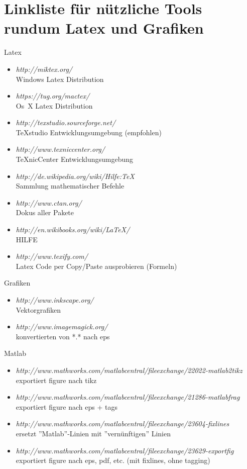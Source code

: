 \chapter{Linkliste für nützliche Tools rundum Latex und Grafiken}
Latex
\begin{itemize}
	\item \emph{http://miktex.org/}   \\ Windows Latex Distribution
	\item \emph{https://tug.org/mactex/}   \\ Os~X Latex Distribution
	\item \emph{http://texstudio.sourceforge.net/}  \\ TeXstudio Entwicklungsumgebung (empfohlen)
	\item \emph{http://www.texniccenter.org/}  \\ TeXnicCenter Entwicklungsumgebung
	\item \emph{http://de.wikipedia.org/wiki/Hilfe:TeX}   \\ Sammlung mathematischer Befehle
	\item \emph{http://www.ctan.org/} \\ Dokus aller Pakete
	\item \emph{http://en.wikibooks.org/wiki/LaTeX/} \\ HILFE
	\item \emph{http://www.texify.com/}	\\ Latex Code per Copy/Paste ausprobieren (Formeln)
\end{itemize}
Grafiken
\begin{itemize}
	\item \emph{http://www.inkscape.org/}   \\ Vektorgrafiken
	\item \emph{http://www.imagemagick.org/}  \\ konvertierten von *.* nach eps	
\end{itemize}
\clearpage
Matlab
\begin{itemize}
	\item \emph{http://www.mathworks.com/matlabcentral/fileexchange/22022-matlab2tikz} \\ exportiert figure nach tikz
	\item \emph{http://www.mathworks.com/matlabcentral/fileexchange/21286-matlabfrag} \\ exportiert figure nach eps + tags
	\item \emph{http://www.mathworks.com/matlabcentral/fileexchange/23604-fixlines} \\ ersetzt ''Matlab''-Linien mit ''vernünftigen'' Linien
	\item \emph{http://www.mathworks.com/matlabcentral/fileexchange/23629-exportfig} \\ exportiert figure nach eps, pdf, etc. (mit fixlines, ohne tagging)
\end{itemize}
